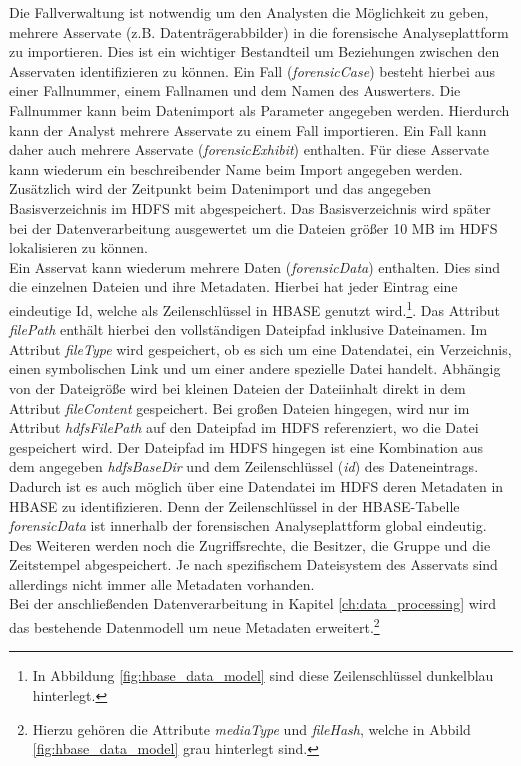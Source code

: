 \noindent
Die Fallverwaltung ist notwendig um den Analysten die Möglichkeit zu geben, mehrere Asservate (z.B. Datenträgerabbilder) in die forensische Analyseplattform zu importieren. Dies ist ein wichtiger Bestandteil um Beziehungen zwischen den Asservaten identifizieren zu können. Ein Fall (\textit{forensicCase}) besteht hierbei aus einer Fallnummer, einem Fallnamen und dem Namen des Auswerters. Die Fallnummer kann beim Datenimport als Parameter angegeben werden. Hierdurch kann der Analyst mehrere Asservate zu einem Fall importieren. Ein Fall kann daher auch mehrere Asservate (\textit{forensicExhibit}) enthalten. Für diese Asservate kann wiederum ein beschreibender Name beim Import angegeben werden. Zusätzlich wird der Zeitpunkt beim Datenimport und das angegeben Basisverzeichnis im HDFS mit abgespeichert. Das Basisverzeichnis wird später bei der Datenverarbeitung ausgewertet um die Dateien größer 10 MB im HDFS lokalisieren zu können.\\

\noindent
Ein Asservat kann wiederum mehrere Daten (\textit{forensicData}) enthalten. Dies sind die einzelnen Dateien und ihre Metadaten. Hierbei hat jeder Eintrag eine eindeutige Id, welche als Zeilenschlüssel in HBASE genutzt wird.\footnote{In Abbildung \ref{fig:hbase_data_model} sind diese Zeilenschlüssel dunkelblau hinterlegt.}. Das Attribut \textit{filePath} enthält hierbei den vollständigen Dateipfad inklusive Dateinamen. Im Attribut \textit{fileType} wird gespeichert, ob es sich um eine Datendatei, ein Verzeichnis, einen symbolischen Link und um einer andere spezielle Datei handelt. Abhängig von der Dateigröße wird bei kleinen Dateien der Dateiinhalt direkt in dem Attribut \textit{fileContent} gespeichert. Bei großen Dateien hingegen, wird nur im Attribut \textit{hdfsFilePath} auf den Dateipfad im HDFS referenziert, wo die Datei gespeichert wird. Der Dateipfad im HDFS hingegen ist eine Kombination aus dem angegeben \textit{hdfsBaseDir} und dem Zeilenschlüssel (\textit{id}) des Dateneintrags. Dadurch ist es auch möglich über eine Datendatei im HDFS deren Metadaten in HBASE zu identifizieren. Denn der Zeilenschlüssel in der HBASE-Tabelle \textit{forensicData} ist innerhalb der forensischen Analyseplattform global eindeutig.\\
Des Weiteren werden noch die Zugriffsrechte, die Besitzer, die Gruppe und die Zeitstempel abgespeichert. Je nach spezifischem Dateisystem des Asservats sind allerdings nicht immer alle Metadaten vorhanden.\\
Bei der anschließenden Datenverarbeitung in Kapitel \ref{ch:data_processing} wird das bestehende Datenmodell um neue Metadaten erweitert.\footnote{Hierzu gehören die Attribute \textit{mediaType} und \textit{fileHash}, welche in Abbild \ref{fig:hbase_data_model} grau hinterlegt sind.}

